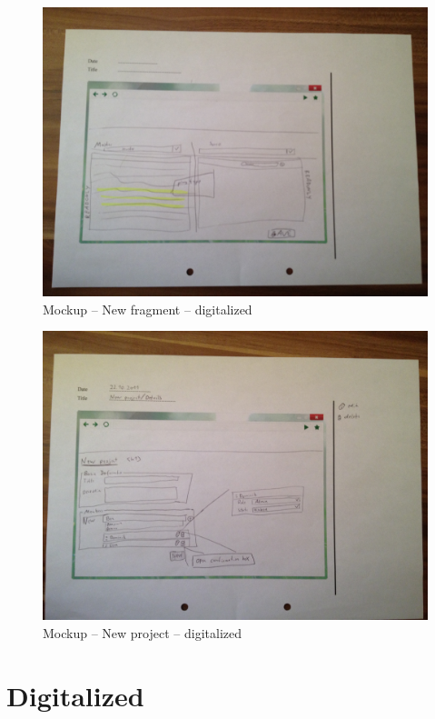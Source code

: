 \begin{appendix}
\begin{figure}[tbp]
  \centering
    \includegraphics[width=\textwidth]{mockups/m_new_fragment.jpg}
  \caption{Mockup – New fragment – digitalized }
  \label{fig:1newCaseMockup}
\end{figure}

\begin{figure}[tbp]
  \centering
    \includegraphics[width=\textwidth]{mockups/m_new_project.jpg}
  \caption{Mockup – New project – digitalized }
  \label{fig:mNewProjectMockup}
\end{figure}

\clearpage
\section{Digitalized}


\end{appendix}

